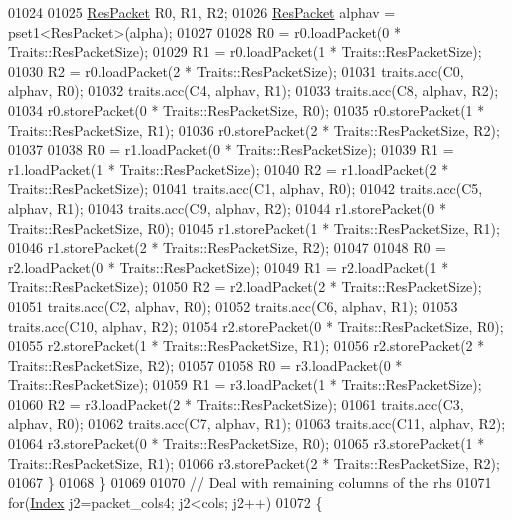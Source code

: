 \begin{DoxyCode}
01024 
01025           \hyperlink{class_eigen_1_1internal_1_1_tensor_lazy_evaluator_writable}{ResPacket} R0, R1, R2;
01026           \hyperlink{class_eigen_1_1internal_1_1_tensor_lazy_evaluator_writable}{ResPacket} alphav = pset1<ResPacket>(alpha);
01027 
01028           R0 = r0.loadPacket(0 * Traits::ResPacketSize);
01029           R1 = r0.loadPacket(1 * Traits::ResPacketSize);
01030           R2 = r0.loadPacket(2 * Traits::ResPacketSize);
01031           traits.acc(C0, alphav, R0);
01032           traits.acc(C4, alphav, R1);
01033           traits.acc(C8, alphav, R2);
01034           r0.storePacket(0 * Traits::ResPacketSize, R0);
01035           r0.storePacket(1 * Traits::ResPacketSize, R1);
01036           r0.storePacket(2 * Traits::ResPacketSize, R2);
01037 
01038           R0 = r1.loadPacket(0 * Traits::ResPacketSize);
01039           R1 = r1.loadPacket(1 * Traits::ResPacketSize);
01040           R2 = r1.loadPacket(2 * Traits::ResPacketSize);
01041           traits.acc(C1, alphav, R0);
01042           traits.acc(C5, alphav, R1);
01043           traits.acc(C9, alphav, R2);
01044           r1.storePacket(0 * Traits::ResPacketSize, R0);
01045           r1.storePacket(1 * Traits::ResPacketSize, R1);
01046           r1.storePacket(2 * Traits::ResPacketSize, R2);
01047 
01048           R0 = r2.loadPacket(0 * Traits::ResPacketSize);
01049           R1 = r2.loadPacket(1 * Traits::ResPacketSize);
01050           R2 = r2.loadPacket(2 * Traits::ResPacketSize);
01051           traits.acc(C2, alphav, R0);
01052           traits.acc(C6, alphav, R1);
01053           traits.acc(C10, alphav, R2);
01054           r2.storePacket(0 * Traits::ResPacketSize, R0);
01055           r2.storePacket(1 * Traits::ResPacketSize, R1);
01056           r2.storePacket(2 * Traits::ResPacketSize, R2);
01057 
01058           R0 = r3.loadPacket(0 * Traits::ResPacketSize);
01059           R1 = r3.loadPacket(1 * Traits::ResPacketSize);
01060           R2 = r3.loadPacket(2 * Traits::ResPacketSize);
01061           traits.acc(C3, alphav, R0);
01062           traits.acc(C7, alphav, R1);
01063           traits.acc(C11, alphav, R2);
01064           r3.storePacket(0 * Traits::ResPacketSize, R0);
01065           r3.storePacket(1 * Traits::ResPacketSize, R1);
01066           r3.storePacket(2 * Traits::ResPacketSize, R2);          
01067           \}
01068         \}
01069 
01070         \textcolor{comment}{// Deal with remaining columns of the rhs}
01071         \textcolor{keywordflow}{for}(\hyperlink{namespace_eigen_a62e77e0933482dafde8fe197d9a2cfde}{Index} j2=packet\_cols4; j2<cols; j2++)
01072         \{

\end{DoxyCode}
